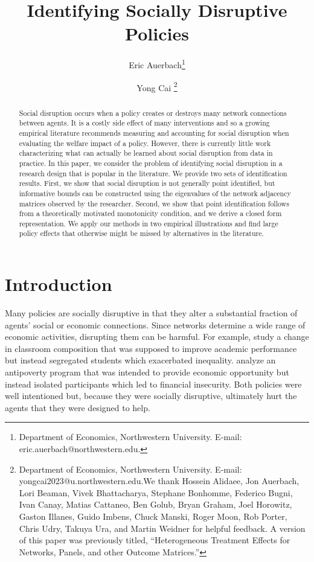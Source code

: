 \documentclass[12pt]{article}
\title{Identifying Socially Disruptive Policies}
\author{Eric Auerbach\footnote{Department of Economics, Northwestern University. E-mail: eric.auerbach@northwestern.edu.} \and Yong Cai \footnote{Department of Economics, Northwestern University. E-mail: yongcai2023@u.northwestern.edu.\newline We thank Hossein Alidaee, Jon Auerbach, Lori Beaman, Vivek Bhattacharya, Stephane Bonhomme, Federico Bugni, Ivan Canay, Matias Cattaneo, Ben Golub, Bryan Graham, Joel Horowitz, Gaston Illanes, Guido Imbens, Chuck Manski, Roger Moon, Rob Porter, Chris Udry, Takuya Ura, and Martin Weidner  for helpful feedback. A version of this paper was previously titled, ``Heterogeneous Treatment Effects for Networks, Panels, and other Outcome Matrices.''  }}
\date{\parbox{\linewidth}{\centering%
  \today\endgraf}}
\theoremstyle{definition}
\begin{document}
\maketitle

\begin{abstract} \noindent
Social disruption occurs when a policy creates or destroys many network connections between agents. It is a costly side effect of many interventions and so a growing empirical literature recommends measuring and accounting for social disruption when evaluating the welfare impact of a policy. However, there is currently little work characterizing what can actually be learned about social disruption from data in practice. In this paper, we consider the problem of identifying social disruption in a research design that is popular in the literature. We provide two sets of identification results. First, we show that social disruption is not generally point identified, but informative bounds can be constructed using the eigenvalues of the network adjacency matrices observed by the researcher. Second, we show that point identification follows from a theoretically motivated monotonicity condition, and we derive a closed form representation. We apply our methods in two empirical illustrations and find large policy effects that otherwise might be missed by alternatives in the literature.    
\end{abstract}


\section{Introduction}

Many policies are socially disruptive in that they alter a substantial fraction of agents' social or economic connections. Since networks determine a wide range of economic activities, disrupting them can be harmful. For example, \cite{carrell2013natural} study a change in classroom composition that was supposed to improve academic performance but instead segregated students which exacerbated inequality. \cite{barnhardt2017moving} analyze an antipoverty program that was intended to provide economic opportunity but instead isolated participants which led to financial insecurity. Both policies were well intentioned but, because they were socially disruptive, ultimately hurt the agents that they were designed to help. 
\end{document}
